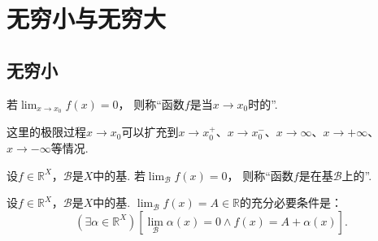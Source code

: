\section{无穷小与无穷大}
\subsection{无穷小}
\begin{definition}
若\(\lim_{x \to x_0} f(x) = 0\)，
则称“函数\(f\)是当\(x \to x_0\)时的”.
\end{definition}
这里的极限过程\(x \to x_0\)可以扩充到\(x \to x_0^+\)、\(x \to x_0^-\)、\(x \to \infty\)、\(x \to +\infty\)、\(x \to -\infty\)等情况.

\begin{definition}
设\(f\in\mathbb{R}^X\)，\(\mathcal{B}\)是\(X\)中的基.
若\(\lim_\mathcal{B} f(x) = 0\)，
则称“函数\(f\)是在基\(\mathcal{B}\)上的”.
\end{definition}

\begin{theorem}
设\(f\in\mathbb{R}^X\)，\(\mathcal{B}\)是\(X\)中的基.
\(\lim_\mathcal{B} f(x) = A \in \mathbb{R}\)的充分必要条件是：\[
	(\exists\alpha\in\mathbb{R}^X)
	\left[
		\lim_\mathcal{B} \alpha(x) = 0
		\land
		f(x) = A + \alpha(x)
	\right].
\]
\end{theorem}

